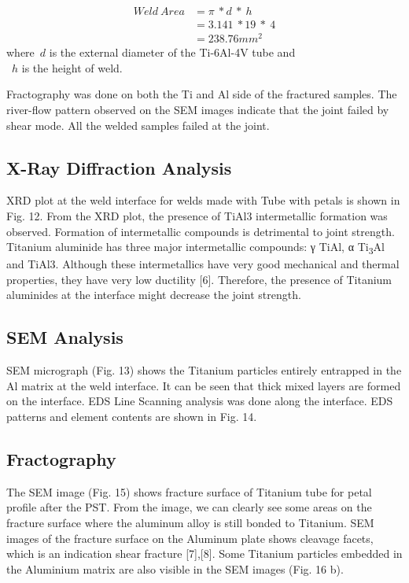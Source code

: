 \documentclass[3p]{elsarticle}
\begin{document}
\begin{align}
Weld\:Area &= \pi \: * d \: * \: h \\
&= 3.141 \: * 19 \: * \: 4       \nonumber \\
&= 238.76 mm^{2} \nonumber
\end{align}
where~$d$ is the external diameter of the Ti-6Al-4V tube and \\
~$h$ is the height of weld.



\par


Fractography was done on both the Ti and Al side of the fractured samples. The river-flow pattern observed on the SEM images indicate that the joint failed by shear mode. All the welded samples failed at the joint.




\subsection{X-Ray Diffraction Analysis}
\label{subsec:XRD-Results}
XRD plot at the weld interface for welds made with Tube with petals is shown in Fig. 12. From the XRD plot, the
presence of TiAl3 intermetallic formation was observed. Formation of intermetallic compounds is detrimental to joint strength. Titanium aluminide has three major intermetallic compounds: γ TiAl, α Ti\textsubscript{3}Al and TiAl3. Although these intermetallics have very good mechanical and thermal properties, they have very low ductility [6]. Therefore, the presence of Titanium aluminides at the interface might decrease the joint strength.

\subsection{SEM Analysis}
\label{subsec:SEM Analysis}
SEM micrograph (Fig. 13) shows the Titanium particles entirely entrapped in the Al matrix at the weld interface. It can be seen that thick mixed layers are formed on the interface. EDS Line Scanning analysis was done along the interface. EDS patterns and element contents are shown in Fig. 14.

\subsection{Fractography}
\label{subsec:Fractography}
The SEM image (Fig. 15) shows fracture surface of Titanium tube for petal profile after the PST. From the image, we can clearly see some areas on the fracture surface where the aluminum alloy is still bonded to Titanium. SEM images of the fracture surface on the Aluminum plate shows cleavage facets, which is an indication shear fracture [7],[8]. Some Titanium particles embedded in the Aluminium matrix are also visible in
the SEM images (Fig. 16 b).
\end{document}
